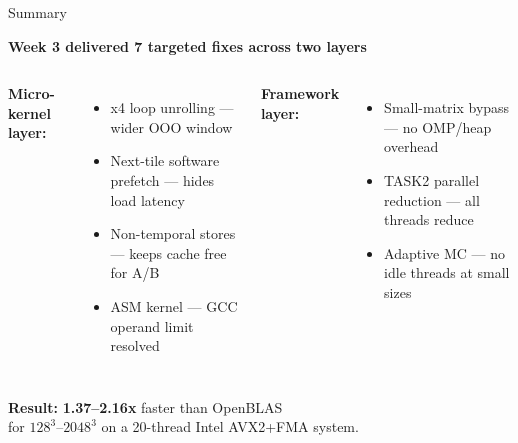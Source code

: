 \documentclass[aspectratio=169]{beamer}
\begin{document}
\begin{frame}{Summary}
  \begin{center}
    \Large\textbf{Week 3 delivered 7 targeted fixes across two layers}
  \end{center}
  \vspace{0.4cm}
  \begin{columns}
    \textbf{Micro-kernel layer:}
    \begin{itemize}
      \item[\textcolor{good}{\checkmark}] x4 loop unrolling --- wider OOO window
      \item[\textcolor{good}{\checkmark}] Next-tile software prefetch --- hides load latency
      \item[\textcolor{good}{\checkmark}] Non-temporal stores --- keeps cache free for A/B
      \item[\textcolor{good}{\checkmark}] ASM kernel --- GCC operand limit resolved
    \end{itemize}

    \textbf{Framework layer:}
    \begin{itemize}
      \item[\textcolor{good}{\checkmark}] Small-matrix bypass --- no OMP/heap overhead
      \item[\textcolor{good}{\checkmark}] TASK2 parallel reduction --- all threads reduce
      \item[\textcolor{good}{\checkmark}] Adaptive MC --- no idle threads at small sizes
    \end{itemize}
  \end{columns}
  \vspace{0.5cm}
  \begin{center}
    \textbf{Result:} \textcolor{good}{\textbf{1.37--2.16x}} faster than OpenBLAS\\
    for $128^3$--$2048^3$ on a 20-thread Intel AVX2+FMA system.
  \end{center}
\end{frame}
\end{document}
